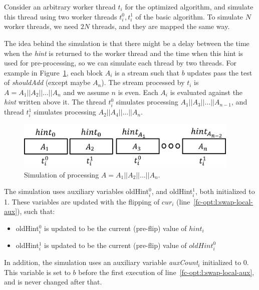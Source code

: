 Consider an arbitrary worker thread $t_i$ for the optimized algorithm,
and simulate this thread using two worker threads $t_i^0,t_i^1$ of the basic algorithm.
To simulate $N$ worker threads, we need $2N$ threads, and they are mapped the same way.

The idea behind the simulation is that there might be a delay between the time when the \emph{hint} is returned to the worker thread and the time when this hint is used for pre-processing, so we can simulate each thread by two threads. For example in Figure~\ref{fc-fig:optimisedSimulation},
each block $A_i$ is a stream such that $b$ updates pass the test of \emph{shouldAdd} (except maybe $A_n$).
The stream processed by $t_i$ is $A=A_1||A_2||\dots||A_n$ and we assume $n$ is even.
Each $A_i$ is evaluated against the \emph{hint} written above it. The thread $t_i^0$ simulates processing
$A_1||A_3||\dots ||A_{n-1}$, and thread $t_i^1$ simulates processing $A_2||A_4||\dots||A_n$.

\begin{figure}[H]
    \centering
    \includegraphics[width=4.2in]{graphics/fast-concurrent/optimisedSimulation.png}
    \caption{Simulation of processing $A=A_1||A_2||\dots||A_n$.}
    \label{fc-fig:optimisedSimulation}
\end{figure}

The simulation uses auxiliary variables oldHint$_i^0$, and oldHint$_i^1$, both initialized to 1.
These variables are updated with the flipping of $cur_i$ (line~\ref{fc-opt:l:swap-local-aux}), such that:
\begin{itemize}
    \item oldHint$_i^0$ is updated to be the current (pre-flip) value of $hint_i$
    \item oldHint$_i^1$ is updated to be the current (pre-flip) value of $oldHint_i^0$
\end{itemize}


In addition, the simulation uses an auxiliary variable \emph{auxCount$_i$} initialized to 0. This variable is set to
$b$ before the first execution of line~\ref{fc-opt:l:swap-local-aux}, and is never changed after that. 

